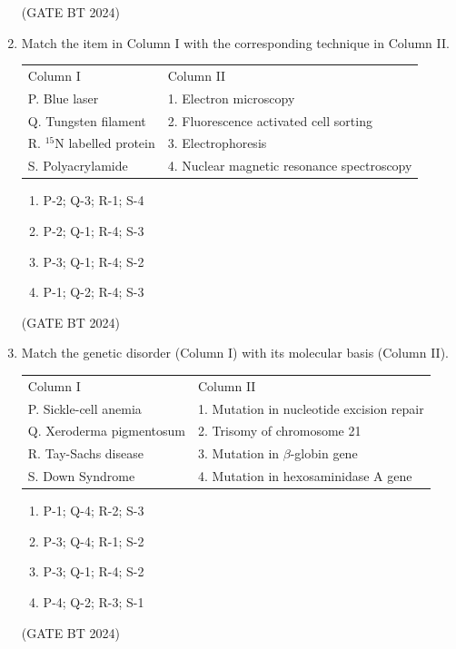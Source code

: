 \documentclass[journal,12pt,onecolumn]{IEEEtran}
\theoremstyle{remark}
\begin{document}
\begin{enumerate}
\hfill (GATE BT 2024)

\item Match the item in Column I with the corresponding technique in Column II.

\begin{tabular}{ll}
Column I & Column II \\
P. Blue laser & 1. Electron microscopy \\
Q. Tungsten filament & 2. Fluorescence activated cell sorting \\
R. $^{15}$N labelled protein & 3. Electrophoresis \\
S. Polyacrylamide & 4. Nuclear magnetic resonance spectroscopy \\
\end{tabular}

\begin{enumerate}
\item P-2; Q-3; R-1; S-4 \hfill
\item P-2; Q-1; R-4; S-3 \hfill
\item P-3; Q-1; R-4; S-2 \hfill
\item P-1; Q-2; R-4; S-3
\end{enumerate}

\hfill (GATE BT 2024)

\item Match the genetic disorder (Column I) with its molecular basis (Column II).

\begin{tabular}{ll}
Column I & Column II \\
P. Sickle-cell anemia & 1. Mutation in nucleotide excision repair \\
Q. Xeroderma pigmentosum & 2. Trisomy of chromosome 21 \\
R. Tay-Sachs disease & 3. Mutation in $\beta$-globin gene \\
S. Down Syndrome & 4. Mutation in hexosaminidase A gene \\
\end{tabular}

\begin{enumerate}
\item P-1; Q-4; R-2; S-3 \hfill
\item P-3; Q-4; R-1; S-2 \hfill
\item P-3; Q-1; R-4; S-2 \hfill
\item P-4; Q-2; R-3; S-1
\end{enumerate}

\hfill (GATE BT 2024)


\end{enumerate}
\end{document}
